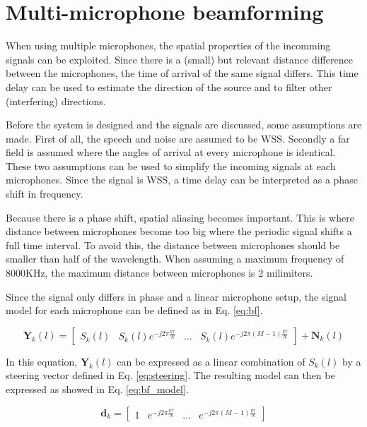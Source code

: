 \section{Multi-microphone beamforming} \label{sec:mm_bf}
When using multiple microphones, the spatial properties of the incomming signals can be exploited. Since there is a (small) but relevant  distance difference between the microphones, the time of arrival of the same signal differs. This time delay can be used to estimate the direction of the source and to filter other (interfering) directions.

Before the system is designed and the signals are discussed, some assumptions are made. First of all, the speech and noise are assumed to be  WSS. Secondly a far field is assumed where the angles of arrival at every microphone is identical. These two assumptions can be used to simplify the incoming signals at each microphones. Since the signal is WSS, a time delay can be interpreted as a phase shift in frequency.

Because there is a phase shift, spatial aliasing becomes important. This is where distance between microphones become too big where the periodic signal shifts a full time interval. To avoid this, the distance between microphones should be smaller than half of the wavelength. When assuming a maximum frequency of 8000KHz, the maximum distance between microphones is 2 milimiters.

Since the signal only differs in phase and a linear microphone setup, the signal model for each microphone can be defined as in Eq. \ref{eq:bf}.

\begin{equation}
  \mathbf{Y}_{k}(l) =
  \begin{bmatrix}
    S_{k}(l) & S_{k}(l)e^{-j2\pi\frac{k\tau}{N}} & \hdots & S_{k}(l)e^{-j2\pi(M-1)\frac{k\tau}{N}}
  \end{bmatrix}
  + \mathbf{N}_{k}(l)
  \label{eq:bf}
\end{equation}

In this equation, $\mathbf{Y}_{k}(l)$ can be expressed as a linear combination of $S_{k}(l)$ by a steering vector defined in Eq. \ref{eq:steering}. The resulting model can then be expressed as showed in Eq. \ref{eq:bf_model}.

\begin{equation}
  \mathbf{d}_{k} =
  \begin{bmatrix}
    1 & e^{-j2\pi \frac{k\tau}{N}} & \hdots & e^{-j2\pi(M-1)\frac{k\tau}{N}}
  \end{bmatrix}
  \label{eq:steering}
\end{equation}

